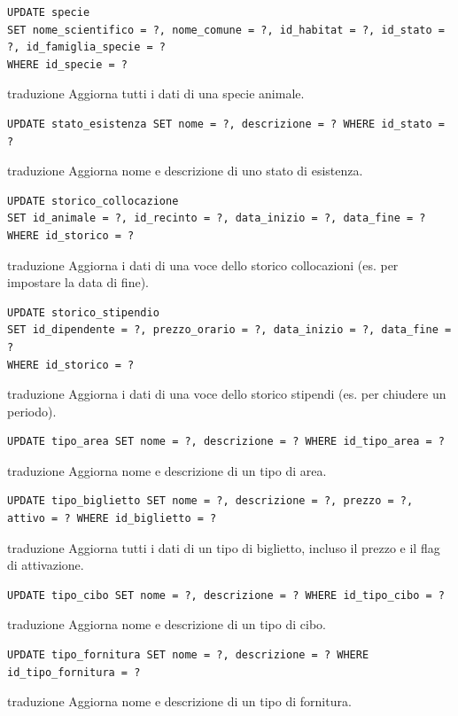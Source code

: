 \documentclass[12pt,a4paper]{report}
\begin{document}
\begin{lstlisting}[style=sqlstyle]
UPDATE specie
SET nome_scientifico = ?, nome_comune = ?, id_habitat = ?, id_stato = ?, id_famiglia_specie = ?
WHERE id_specie = ?
\end{lstlisting}
traduzione {Aggiorna tutti i dati di una specie animale.}

\begin{lstlisting}[style=sqlstyle]
UPDATE stato_esistenza SET nome = ?, descrizione = ? WHERE id_stato = ?
\end{lstlisting}
traduzione {Aggiorna nome e descrizione di uno stato di esistenza.}

\begin{lstlisting}[style=sqlstyle]
UPDATE storico_collocazione
SET id_animale = ?, id_recinto = ?, data_inizio = ?, data_fine = ?
WHERE id_storico = ?
\end{lstlisting}
traduzione {Aggiorna i dati di una voce dello storico collocazioni (es. per impostare la data di fine).}

\begin{lstlisting}[style=sqlstyle]
UPDATE storico_stipendio
SET id_dipendente = ?, prezzo_orario = ?, data_inizio = ?, data_fine = ?
WHERE id_storico = ?
\end{lstlisting}
traduzione {Aggiorna i dati di una voce dello storico stipendi (es. per chiudere un periodo).}

\begin{lstlisting}[style=sqlstyle]
UPDATE tipo_area SET nome = ?, descrizione = ? WHERE id_tipo_area = ?
\end{lstlisting}
traduzione {Aggiorna nome e descrizione di un tipo di area.}

\begin{lstlisting}[style=sqlstyle]
UPDATE tipo_biglietto SET nome = ?, descrizione = ?, prezzo = ?, attivo = ? WHERE id_biglietto = ?
\end{lstlisting}
traduzione {Aggiorna tutti i dati di un tipo di biglietto, incluso il prezzo e il flag di attivazione.}

\begin{lstlisting}[style=sqlstyle]
UPDATE tipo_cibo SET nome = ?, descrizione = ? WHERE id_tipo_cibo = ?
\end{lstlisting}
traduzione {Aggiorna nome e descrizione di un tipo di cibo.}

\begin{lstlisting}[style=sqlstyle]
UPDATE tipo_fornitura SET nome = ?, descrizione = ? WHERE id_tipo_fornitura = ?
\end{lstlisting}
traduzione {Aggiorna nome e descrizione di un tipo di fornitura.}
\end{document}
